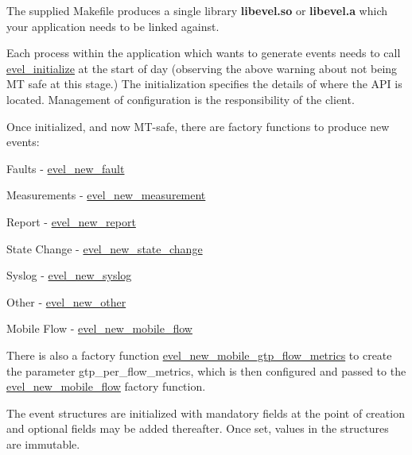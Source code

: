 The supplied Makefile produces a single library {\bfseries libevel.\+so} or {\bfseries libevel.\+a} which your application needs to be linked against.

Each process within the application which wants to generate events needs to call \hyperlink{evel_8h_a059033f948f5bf406fedb4a7ef1966da}{evel\+\_\+initialize} at the start of day (observing the above warning about not being MT safe at this stage.) The initialization specifies the details of where the A\+PI is located. Management of configuration is the responsibility of the client.

Once initialized, and now M\+T-\/safe, there are factory functions to produce new events\+:
\begin{DoxyItemize}
\item Faults -\/ \hyperlink{evel__fault_8c_a6dd9b72800e61e661dc133b588aab892}{evel\+\_\+new\+\_\+fault}
\item Measurements -\/ \hyperlink{evel__scaling__measurement_8c_af19dc9c6757bfaa522f078a7a2248569}{evel\+\_\+new\+\_\+measurement}
\item Report -\/ \hyperlink{evel__reporting__measurement_8c_a77971f763ebf42efb1a5b0a12bbe579d}{evel\+\_\+new\+\_\+report}
\item State Change -\/ \hyperlink{evel__state__change_8c_a4f0a7868b54799f13f282ada5c9dcc2e}{evel\+\_\+new\+\_\+state\+\_\+change}
\item Syslog -\/ \hyperlink{evel__syslog_8c_ab8e1f617e4d69633fdd1f7dd297871d6}{evel\+\_\+new\+\_\+syslog}
\item Other -\/ \hyperlink{evel__other_8c_ac49e6b3de08b4d4677a7bad8d615c97b}{evel\+\_\+new\+\_\+other}
\item Mobile Flow -\/ \hyperlink{evel__mobile__flow_8c_a91056c1aef2f8a33a32920fdfc4fe23a}{evel\+\_\+new\+\_\+mobile\+\_\+flow}
\end{DoxyItemize}

There is also a factory function \hyperlink{evel__mobile__flow_8c_a8440103cf9c7ba48182528948d2ebc49}{evel\+\_\+new\+\_\+mobile\+\_\+gtp\+\_\+flow\+\_\+metrics} to create the parameter gtp\+\_\+per\+\_\+flow\+\_\+metrics, which is then configured and passed to the \hyperlink{evel__mobile__flow_8c_a91056c1aef2f8a33a32920fdfc4fe23a}{evel\+\_\+new\+\_\+mobile\+\_\+flow} factory function.

The event structures are initialized with mandatory fields at the point of creation and optional fields may be added thereafter. Once set, values in the structures are immutable.

